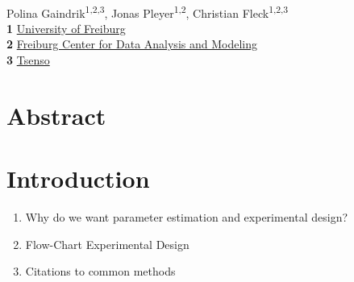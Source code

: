 \documentclass[10pt,A4paper]{article}
\begin{document}
\vspace*{0.2in}
\begin{flushleft}
{\Large
\textbf{}}
\newline
\\
Polina Gaindrik\textsuperscript{1,2,3},
Jonas Pleyer\textsuperscript{1,2},
Christian Fleck\textsuperscript{1,2,3}
\\
\bigskip
\textbf{1} \href{https://www.fdm.uni-freiburg.de/spatsysbio}{University of Freiburg}\\
\textbf{2} \href{https://www.fdm.uni-freiburg.de/spatsysbio}{Freiburg Center for Data Analysis and Modeling}\\
\textbf{3} \href{https://tsenso.com/en/}{Tsenso}\\
\bigskip

\end{flushleft}
\section*{Abstract}
\linenumbers
%
%
%
\section*{Introduction}
%
\begin{enumerate}
	\item Why do we want parameter estimation and experimental design?
	\item Flow-Chart Experimental Design
	\item Citations to common methods
\end{enumerate}
\end{document}
